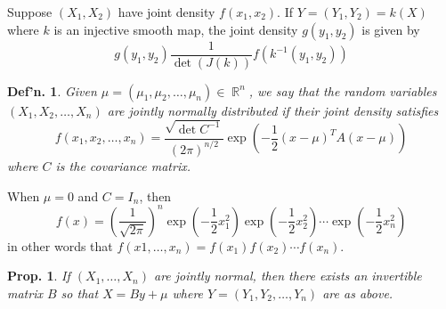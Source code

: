 \documentclass[12pt, a4paper]{book}
\DeclareMathOperator{\R}{\mathbb{R}}
\newtheorem{definition}[theorem]{Def'n.}
\newtheorem{proposition}[theorem]{Prop.}
\theoremstyle{nonumberplain}
\begin{document}
Suppose $(X_1,X_2)$ have joint density $f(x_1,x_2)$.
If $Y=(Y_1,Y_2)=k(X)$ where $k$ is an injective smooth map, the joint density $g(y_1,y_2)$ is given by
\[g(y_1,y_2)\frac{1}{\det(J(k))}f(k^{-1}(y_1,y_2))\]
\begin{definition}
    Given $\mu=(\mu_1,\mu_2,\ldots,\mu_n)\in\R^n$, we say that the random variables $(X_1,X_2,\ldots,X_n)$ are jointly normally distributed if their joint density satisfies
    \[f(x_1,x_2,\ldots,x_n) = \frac{\sqrt{\det C^{-1}}}{(2\pi)^{n/2}}\exp\left(-\frac{1}{2}(x-\mu)^TA(x-\mu)\right)\]
    where $C$ is the covariance matrix.
\end{definition}
When $\mu=0$ and $C=I_n$, then
\[f(x)=\left(\frac{1}{\sqrt{2\pi}}\right)^n\exp\left(-\frac{1}{2}x_1^2\right)\exp\left(-\frac{1}{2}x_2^2\right)\cdots\exp\left(-\frac{1}{2}x_n^2\right)\]
in other words that $f(x1,\ldots,x_n)=f(x_1)f(x_2)\cdots f(x_n)$.
\begin{proposition}
    If $(X_1,\ldots,X_n)$ are jointly normal, then there exists an invertible matrix $B$ so that $X=By+\mu$ where $Y=(Y_1,Y_2,\ldots,Y_n)$ are as above.
\end{proposition}
\end{document}
